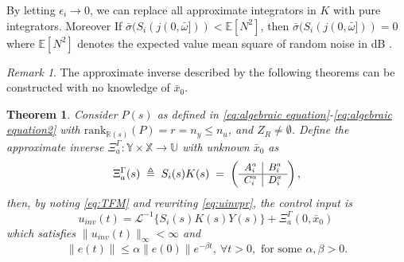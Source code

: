 \documentclass[journal]{IEEEtran}
\newtheorem{theorem}{Theorem}
\theoremstyle{remark}
\newtheorem{remark}{Remark}
\begin{document}
By letting \(\epsilon_i \to 0\), we can replace all approximate integrators in \(K\) with pure integrators. Moreover
If \(\bar{\sigma}(S_i(j(0,\bar{\omega}])) < \mathbb{E}[N^2]\), then \(\bar{\sigma}(S_i(j(0,\bar{\omega}])) = 0\) where $\mathbb{E}[N^2]$ denotes the expected value mean square of random noise in dB .
\begin{remark}\label{rem:no knowledge synthesis}
The approximate inverse described by the following theorems can be constructed with no knowledge of $\bar{x}_0$.
\end{remark}
\begin{theorem}\label{th:nm_phase_inverses}
Consider \( P(s) \) as defined in \eqref{eq:algebraic equation}-\eqref{eq:algebraic equation2} with \(\text{rank}_{\mathbb{R}(s)}(P) = r = n_y \leq n_u \), and \( Z_R \neq \emptyset \). Define the approximate inverse \(\Xi_a^\Gamma:\mathbb{Y}\times \mathbb{X} \to \mathbb{U}\) with unknown $\bar{x}_0$ as
\begin{equation}
\label{eq:almostinverse}
\Xi_a^\Gamma(s) \;\triangleq\; S_i(s)K(s)
\;=\;\small \left(\begin{array}{c|c}
   A_i^a & B_i^a \\ \hline
   C_i^a & D_i^a
\end{array}\right)\normalsize,
\end{equation}
then, by noting \eqref{eq:TFM} and rewriting \eqref{eq:uinvpr}, the control input is
\begin{equation} \label{eq:almostinverse_time}
  u_{inv}(t) = \mathscr{L}^{-1}\{S_i(s)K(s)Y(s)\} + \Xi_a^\Gamma(0,\bar{x}_0) \,
\end{equation}
which satisfies $\|u_{inv}(t)\|_\infty<\infty$ and
\[
\|e(t)\| \leq \alpha \|e(0)\| e^{-\beta t}, \ \forall t > 0, \text{ for some } \alpha,\beta>0. \]
\end{theorem}
\end{document}
